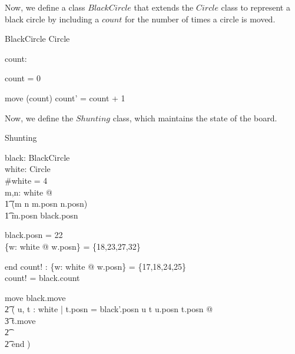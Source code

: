 \documentclass{article}
\begin{document}
Now, we define a class $BlackCircle$ that extends the $Circle$ class to
represent a black circle by including a $count$ for the number of times a
circle is moved.

\begin{class}{BlackCircle}
\also
Circle\\
\begin{state}
  count: \nat
\end{state} \classbreak
\begin{init}
  count = 0
\end{init} \classbreak
\begin{op}{move}
  \Delta(count)
\where
  count' = count + 1
\end{op}
\end{class}

Now, we define the $Shunting$ class, which maintains the state of the
board.

\begin{class}{Shunting}
\also
\begin{state}
  black: BlackCircle \\
  white: \power Circle \\
\where
  \#white = 4 \\
  \forall m,n: white @ \\
      \t1 (m \neq n \iff m.posn \neq n.posn) \land \\
      \t1 m.posn \neq black.posn
\end{state} \classbreak
\begin{init}
  black.posn = 22 \\
  \{w: white @ w.posn\} = \{18,23,27,32\} \\ 
\end{init} \classbreak
\begin{op}{end}
  count! : \nat
\where
  \{w: white @ w.posn\} = \{17,18,24,25\} \\
  count! = black.count
\end{op}  \classbreak
move \sdef black.move \land\\
         \t2 ( \dgch u, t : white | t.posn = black'.posn \land
                u \neq t \land u.posn \neq t.posn @\\
		\t3 t.move\\
		\t2 \gch \\
		\t2 end )
\end{class}
\end{document}
